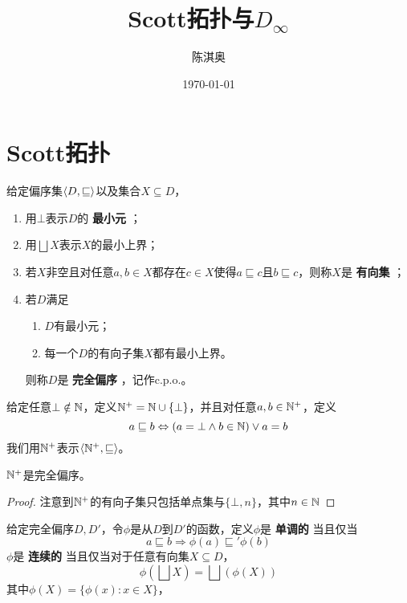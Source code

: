 \documentclass[11pt]{article}
\author{陈淇奥}
\date{\today}
\title{Scott拓扑与\(D_\infty\)}
\begin{document}
\maketitle
\tableofcontents


\section{Scott拓扑}
\label{sec:org0ae8830}
\begin{definition}[]
给定偏序集\(\langle D,\sqsubseteq\rangle\)以及集合\(X\subseteq D\)，
\begin{enumerate}
\item 用\(\bot\)表示\(D\)的 \textbf{最小元} ；
\item 用\(\bigsqcup X\)表示\(X\)的最小上界；
\item 若\(X\)非空且对任意\(a,b\in X\)都存在\(c\in X\)使得\(a\sqsubseteq c\)且\(b\sqsubseteq c\)，则称\(X\)是 \textbf{有向集} ；
\item 若\(D\)满足
\begin{enumerate}
\item \(D\)有最小元；
\item 每一个\(D\)的有向子集\(X\)都有最小上界。
\end{enumerate}
则称\(D\)是 \textbf{完全偏序} ，记作c.p.o.。
\end{enumerate}
\end{definition}

\begin{definition}[]
给定任意\(\bot\notin\mathbb{N}\)，定义\(\mathbb{N}^+=\mathbb{N}\cup\{\bot\}\)，并且对任意\(a,b\in\mathbb{N}^+\)，定义
\begin{equation*}
a\sqsubseteq b\Leftrightarrow(a=\bot\wedge b\in\mathbb{N})\vee a=b
\end{equation*}
我们用\(\mathbb{N}^+\)表示\(\langle\mathbb{N}^+,\sqsubseteq\rangle\)。
\end{definition}

\begin{lemma}[]
\(\mathbb{N}^+\)是完全偏序。
\end{lemma}

\begin{proof}
注意到\(\mathbb{N}^+\)的有向子集只包括单点集与\(\{\bot,n\}\)，其中\(n\in\mathbb{N}\)
\end{proof}

\begin{definition}[]
给定完全偏序\(D,D'\)，令\(\phi\)是从\(D\)到\(D'\)的函数，定义\(\phi\)是 \textbf{单调的} 当且仅当
\begin{equation*}
a\sqsubseteq b\Rightarrow \phi(a)\sqsubseteq'\phi(b)
\end{equation*}
\(\phi\)是 \textbf{连续的} 当且仅当对于任意有向集\(X\subseteq D\)，
\begin{equation*}
\phi(\bigsqcup X)=\bigsqcup(\phi(X))
\end{equation*}
其中\(\phi(X)=\{\phi(x):x\in X\}\)，
\end{definition}
\end{document}
